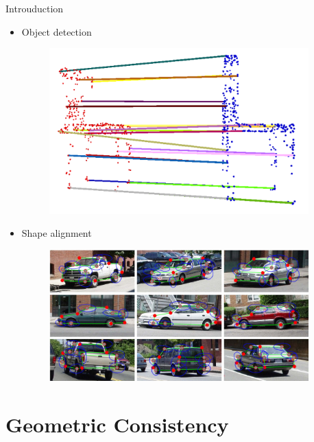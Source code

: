 \documentclass{beamer}
\begin{document}
\begin{frame}{Introuduction}
\begin{itemize}
{\begin{figure}
        \end{figure}
      }
    \item<3-> Object detection
       {
        \begin{figure}
          \includegraphics[width=10cm]{images/object-detection.png}
        \end{figure}
      }
    \item<4-> Shape alignment
       {
        \begin{figure}
          \includegraphics[width=10cm]{images/shape-alignment.jpg}
        \end{figure}
      }
  \end{itemize}
\end{frame}


\section{\hspace{-3mm}Geometric Consistency}
\begin{frame}
  \sectionpage
\end{frame}
\end{document}

